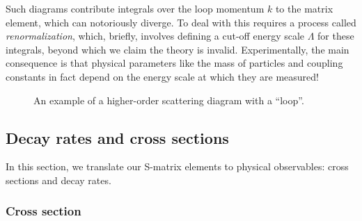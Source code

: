 Such diagrams contribute integrals over the loop momentum $k$ to the matrix element, which can notoriously diverge.
To deal with this requires a process called \textit{renormalization}, which, briefly, involves defining a cut-off energy scale $\Lambda$ for these integrals, beyond which we claim the theory is invalid.
Experimentally, the main consequence is that physical parameters like the mass of particles and coupling constants in fact depend on the energy scale at which they are measured!

\begin{figure}[ht]
	\centering
	\captionsetup{justification=centering}
	\caption{An example of a higher-order scattering diagram with a ``loop''.}
	\label{fig:01_qft_interactions_feynman_loops}
\end{figure}

\subsection{Decay rates and cross sections}
\label{sec:01_qft_interactions_decay}

In this section, we translate our S-matrix elements to physical observables: cross sections and decay rates.

\subsubsection{Cross section}

